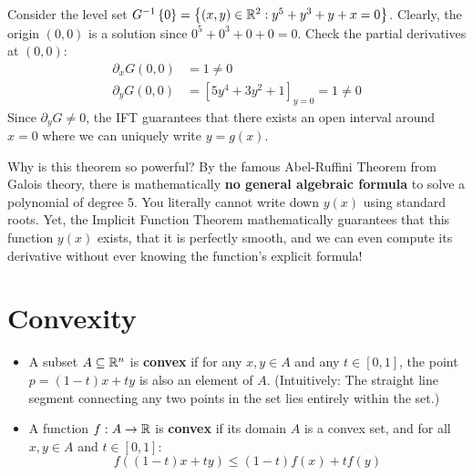 \begin{example*}
Consider the level set $G^{-1}\left\{ 0 \right\} = \left\{ (x,y) \in \mathbb{R}^2 : y^5 + y^3 + y + x = 0 \right\}$.
Clearly, the origin $(0,0)$ is a solution since $0^5 + 0^3 + 0 + 0 = 0$.
Check the partial derivatives at $(0,0)$:
\begin{equation}
\begin{aligned}
    \partial_x G(0,0) &= 1 \ne 0 \\
    \partial_y G(0,0) &= \left[ 5y^4 + 3y^2 + 1 \right]_{y=0} = 1 \ne 0
\end{aligned}
\end{equation}
Since $\partial_y G \ne 0$, the IFT guarantees that there exists an open interval around $x=0$ where we can uniquely write $y = g(x)$. 

\textcolor{eSaddleBrown}{Why is this theorem so powerful?} By the famous Abel-Ruffini Theorem from Galois theory, there is mathematically \textbf{no general algebraic formula} to solve a polynomial of degree 5. You literally cannot write down $y(x)$ using standard roots. Yet, the Implicit Function Theorem mathematically guarantees that this function $y(x)$ exists, that it is perfectly smooth, and we can even compute its derivative without ever knowing the function's explicit formula!
\end{example*}

\setcounter{section}{5} %

\section{Convexity}

\begin{definition*}
\begin{itemize}
    \item A subset $A \subseteq \mathbb{R}^n$ is \textbf{convex} if for any $x, y \in A$ and any $t \in [0,1]$, the point $p = (1-t)x + ty$ is also an element of $A$. \textcolor{eGray}{(Intuitively: The straight line segment connecting any two points in the set lies entirely within the set.)}
    
    \item A function $f: A \to \mathbb{R}$ is \textbf{convex} if its domain $A$ is a convex set, and for all $x, y \in A$ and $t \in [0,1]$:
    \[ f((1-t)x + ty) \le (1-t)f(x) + t f(y) \]
\end{itemize}
\end{definition*}

